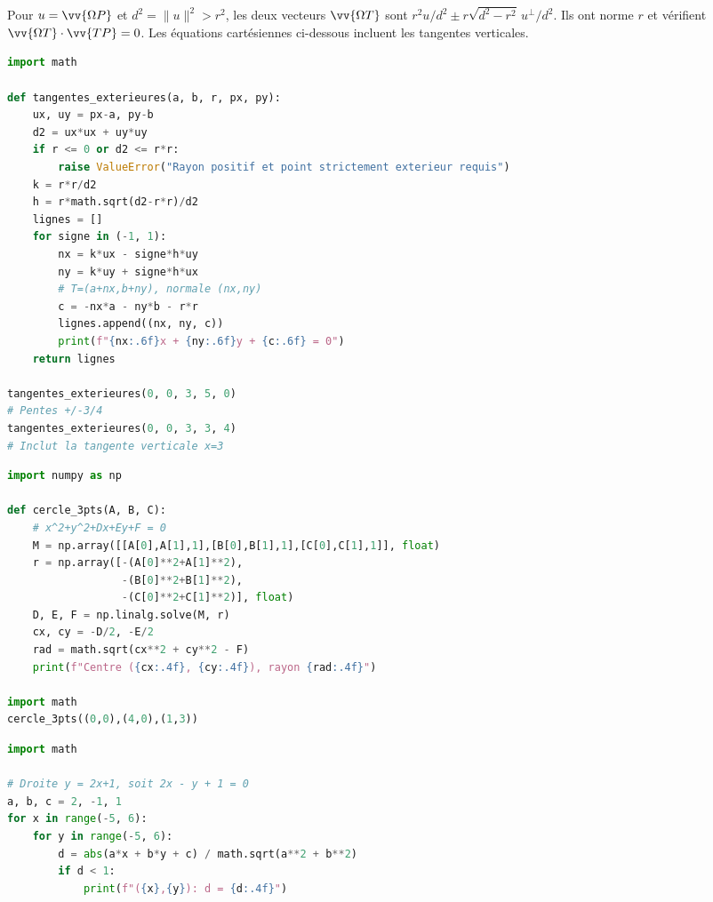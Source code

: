 
Pour $u=\vv{\Omega P}$ et $d^2=\|u\|^2>r^2$, les deux vecteurs
$\vv{\Omega T}$ sont $r^2u/d^2\pm r\sqrt{d^2-r^2}\,u^\perp/d^2$.
Ils ont norme $r$ et v\'erifient $\vv{\Omega T}\cdot\vv{TP}=0$.
Les \'equations cart\'esiennes ci-dessous incluent les tangentes verticales.
\begin{lstlisting}[language=Python]
import math

def tangentes_exterieures(a, b, r, px, py):
    ux, uy = px-a, py-b
    d2 = ux*ux + uy*uy
    if r <= 0 or d2 <= r*r:
        raise ValueError("Rayon positif et point strictement exterieur requis")
    k = r*r/d2
    h = r*math.sqrt(d2-r*r)/d2
    lignes = []
    for signe in (-1, 1):
        nx = k*ux - signe*h*uy
        ny = k*uy + signe*h*ux
        # T=(a+nx,b+ny), normale (nx,ny)
        c = -nx*a - ny*b - r*r
        lignes.append((nx, ny, c))
        print(f"{nx:.6f}x + {ny:.6f}y + {c:.6f} = 0")
    return lignes

tangentes_exterieures(0, 0, 3, 5, 0)
# Pentes +/-3/4
tangentes_exterieures(0, 0, 3, 3, 4)
# Inclut la tangente verticale x=3
\end{lstlisting}


\begin{lstlisting}[language=Python]
import numpy as np

def cercle_3pts(A, B, C):
    # x^2+y^2+Dx+Ey+F = 0
    M = np.array([[A[0],A[1],1],[B[0],B[1],1],[C[0],C[1],1]], float)
    r = np.array([-(A[0]**2+A[1]**2),
                  -(B[0]**2+B[1]**2),
                  -(C[0]**2+C[1]**2)], float)
    D, E, F = np.linalg.solve(M, r)
    cx, cy = -D/2, -E/2
    rad = math.sqrt(cx**2 + cy**2 - F)
    print(f"Centre ({cx:.4f}, {cy:.4f}), rayon {rad:.4f}")

import math
cercle_3pts((0,0),(4,0),(1,3))
\end{lstlisting}


\begin{lstlisting}[language=Python]
import math

# Droite y = 2x+1, soit 2x - y + 1 = 0
a, b, c = 2, -1, 1
for x in range(-5, 6):
    for y in range(-5, 6):
        d = abs(a*x + b*y + c) / math.sqrt(a**2 + b**2)
        if d < 1:
            print(f"({x},{y}): d = {d:.4f}")
\end{lstlisting}

